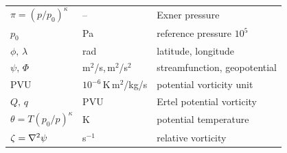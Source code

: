 \begin{longtable}{lll}
  $\pi=(p/p_0)^{\kappa}$ & --         & Exner pressure \\
  $p_0$                & Pa           & reference pressure $10^{5}$ \\
  $\phi,\,\lambda$     & rad          & latitude, longitude \\
  $\psi,\,\Phi$        & m$^2$/s,\,m$^2$/s$^2$ & streamfunction, geopotential \\
  PVU                  & $10^{-6}$\,K\,m$^2$/kg/s & potential vorticity unit \\
  $Q,\,q$              & PVU          & Ertel potential vorticity \\
  $\theta=T(p_0/p)^{\kappa}$ & K      & potential temperature \\
  $\zeta=\nabla^{2}\psi$     & s$^{-1}$     & relative vorticity \\
  \bottomrule
\end{longtable}
